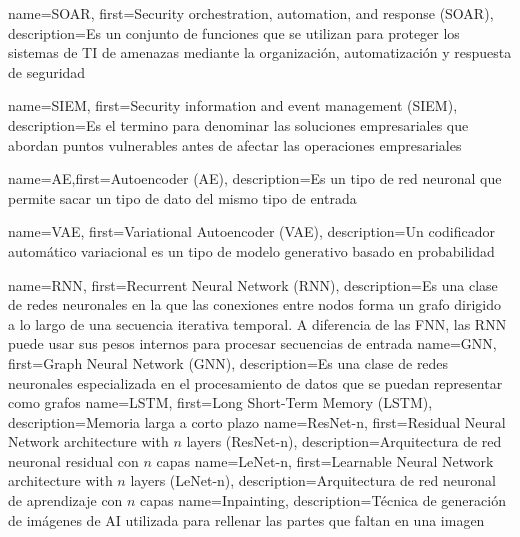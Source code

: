   {name={SOAR}, first={Security orchestration, automation, and response (SOAR)}, description={Es un conjunto de funciones que se utilizan para proteger los sistemas de TI de amenazas mediante la organización, automatización y respuesta de seguridad}}

  {name={SIEM}, first={Security information and event management (SIEM)}, description={Es el termino para denominar las soluciones empresariales que abordan puntos vulnerables antes de afectar las operaciones empresariales}}



   {name={AE},first={Autoencoder (AE)}, description={Es un tipo de red neuronal que permite sacar un tipo de dato del mismo tipo de entrada}}

  {name={VAE}, first={Variational Autoencoder (VAE)}, description={Un codificador automático variacional es un tipo de modelo generativo basado en probabilidad}}


  {name={RNN}, first={Recurrent Neural Network (RNN)}, description={Es una clase de redes neuronales en la que las conexiones entre nodos forma un grafo dirigido a lo largo de una secuencia iterativa temporal. A diferencia de las FNN, las RNN puede usar sus pesos internos para procesar secuencias de entrada}}
  {name={GNN}, first={Graph Neural Network (GNN)}, description={Es una clase de redes neuronales especializada en el procesamiento de datos que se puedan representar como grafos}}
 {name={LSTM}, first={Long Short-Term Memory (LSTM)}, description={Memoria larga a corto plazo}}
 {name={ResNet-n}, first={Residual Neural Network architecture with ${n}$ layers (ResNet-n)},    description={Arquitectura de red neuronal residual con ${n}$ capas}}
  {name={LeNet-n}, first={Learnable Neural Network architecture with ${n}$ layers (LeNet-n)},    description={Arquitectura de red neuronal de aprendizaje con ${n}$ capas}}
 {name={Inpainting}, description={Técnica de generación de imágenes de AI utilizada para rellenar las partes que faltan en una imagen}}


